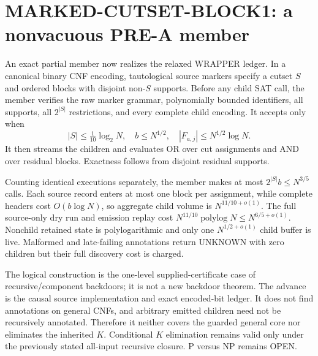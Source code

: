 \section{MARKED-CUTSET-BLOCK1: a nonvacuous PRE-A member}
\label{sec:construction-strengthen6-wrapper}

An exact partial member now realizes the relaxed WRAPPER ledger.  In a
canonical binary CNF encoding, tautological source markers specify a cutset
$S$ and ordered blocks with disjoint non-$S$ supports.  Before any child SAT
call, the member verifies the raw marker grammar, polynomially bounded
identifiers, all supports, all
$2^{|S|}$ restrictions, and every complete child encoding.  It accepts only
when
\[
 |S|\le\tfrac1{10}\log_2N,\quad b\le N^{1/2},\quad
 |F_{a,j}|\le N^{1/2}\log N.
\]
It then streams the children and evaluates OR over cut assignments and AND
over residual blocks.  Exactness follows from disjoint residual supports.

Counting identical executions separately, the member makes at most
$2^{|S|}b\le N^{3/5}$ calls.  Each source record enters at most one block per
assignment, while complete headers cost $O(b\log N)$, so aggregate child
volume is $N^{11/10+o(1)}$.  The full source-only dry run and emission replay
cost $N^{11/10}\operatorname{polylog}N\le N^{6/5+o(1)}$.  Nonchild retained
state is polylogarithmic and only one $N^{1/2+o(1)}$ child buffer is live.
Malformed and late-failing annotations return UNKNOWN with zero children but
their full discovery cost is charged.

The logical construction is the one-level supplied-certificate case of
recursive/component backdoors; it is not a new backdoor theorem.  The advance
is the causal source implementation and exact encoded-bit ledger.  It does
not find annotations on general CNFs, and arbitrary emitted children need not
be recursively annotated.  Therefore it neither covers the guarded general
core nor eliminates the inherited $K$.  Conditional $K$ elimination remains
valid only under the previously stated all-input recursive closure.  P versus
NP remains OPEN.
